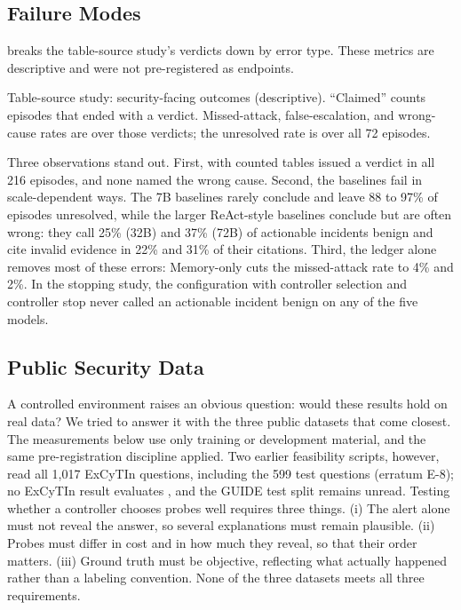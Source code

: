 \subsection{Failure Modes}
\label{sec:security}
 breaks the table-source study's verdicts down by error type. These metrics are descriptive and were not pre-registered as endpoints.

\begin{table}[t]
  \caption{Table-source study: security-facing outcomes (descriptive). ``Claimed'' counts episodes that ended with a verdict. Missed-attack, false-escalation, and wrong-cause rates are over those verdicts; the unresolved rate is over all 72 episodes.}
  \label{tab:security}
  \centering\small
  \begin{adjustbox}{max width=\textwidth}\end{adjustbox}
\end{table}

Three observations stand out. First, with counted tables \hesp{} issued a verdict in all 216 episodes, and none named the wrong cause. Second, the baselines fail in scale-dependent ways. The 7B baselines rarely conclude and leave 88 to 97\% of episodes unresolved, while the larger ReAct-style baselines conclude but are often wrong: they call 25\% (32B) and 37\% (72B) of actionable incidents benign and cite invalid evidence in 22\% and 31\% of their citations. Third, the ledger alone removes most of these errors: Memory-only cuts the missed-attack rate to 4\% and 2\%. In the stopping study, the configuration with controller selection and controller stop never called an actionable incident benign on any of the five models.

\subsection{Public Security Data}
\label{sec:realdata}
A controlled environment raises an obvious question: would these results hold on real data? We tried to answer it with the three public datasets that come closest. The measurements below use only training or development material, and the same pre-registration discipline applied. Two earlier feasibility scripts, however, read all 1{,}017 ExCyTIn questions, including the 599 test questions (erratum E-8); no ExCyTIn result evaluates \hesp{}, and the GUIDE test split remains unread. Testing whether a controller chooses probes well requires three things. (i) The alert alone must not reveal the answer, so several explanations must remain plausible. (ii) Probes must differ in cost and in how much they reveal, so that their order matters. (iii) Ground truth must be objective, reflecting what actually happened rather than a labeling convention. None of the three datasets meets all three requirements.

